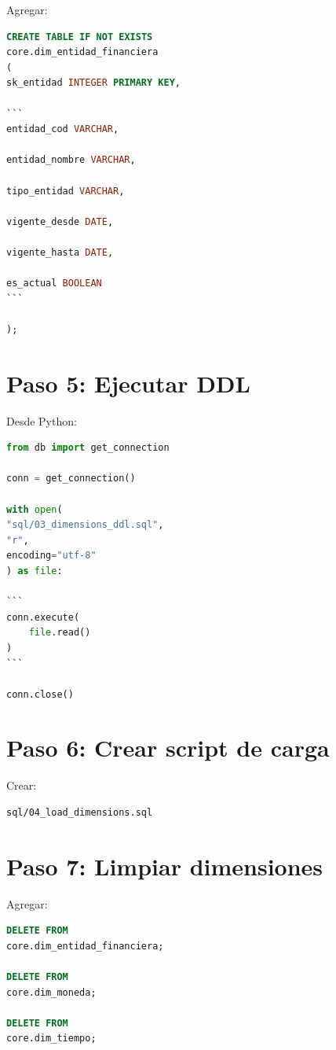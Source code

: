 Agregar:

\begin{lstlisting}[language=SQL]
CREATE TABLE IF NOT EXISTS
core.dim_entidad_financiera
(
sk_entidad INTEGER PRIMARY KEY,

```
entidad_cod VARCHAR,

entidad_nombre VARCHAR,

tipo_entidad VARCHAR,

vigente_desde DATE,

vigente_hasta DATE,

es_actual BOOLEAN
```

);
\end{lstlisting}

\section{Paso 5: Ejecutar DDL}

Desde Python:

\begin{lstlisting}[language=Python]
from db import get_connection

conn = get_connection()

with open(
"sql/03_dimensions_ddl.sql",
"r",
encoding="utf-8"
) as file:

```
conn.execute(
    file.read()
)
```

conn.close()
\end{lstlisting}

\section{Paso 6: Crear script de carga}

Crear:

\begin{verbatim}
sql/04_load_dimensions.sql
\end{verbatim}

\section{Paso 7: Limpiar dimensiones}

Agregar:

\begin{lstlisting}[language=SQL]
DELETE FROM
core.dim_entidad_financiera;

DELETE FROM
core.dim_moneda;

DELETE FROM
core.dim_tiempo;
\end{lstlisting}

